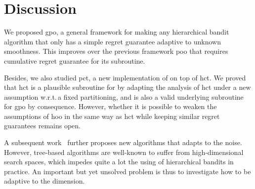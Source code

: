 \section{Discussion}\label{sec:gpo.discussion}

We proposed \gls{gpo}, a general framework for making any hierarchical bandit algorithm that only has a simple regret guarantee adaptive to unknown smoothness. This improves over the previous framework \gls{poo} that requires cumulative regret guarantee for its subroutine.

Besides, we also studied \gls{pct}, a new implementation of \POO on top of \gls{hct}. We proved that \gls{hct} is a plausible subroutine for \POO by adapting the analysis of \gls{hct} under a new assumption w.r.t.\,a fixed partitioning, and is also a valid underlying subroutine for \gls{gpo} by consequence. However, whether it is possible to weaken the assumptions of \gls{hoo} in the same way as \gls{hct} while keeping similar regret guarantees remains open.

A subsequent work~\citep{bartlett2019simple} further proposes new algorithms that adapts to the noise. However, tree-based algorithms are well-known to suffer from high-dimensional search spaces, which impedes quite a lot the using of hierarchical bandits in practice. An important but yet unsolved problem is thus to investigate how to be adaptive to the dimension. 
